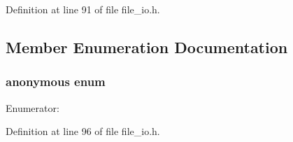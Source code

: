 Definition at line 91 of file file\_\-io.h.



\subsection{Member Enumeration Documentation}
\hypertarget{classmocha_1_1_file_i_o_a33f3257114b98f0bcfd1b453502322cc}{
\subsubsection[{"@24}]{\setlength{\rightskip}{0pt plus 5cm}anonymous enum}}
\label{classmocha_1_1_file_i_o_a33f3257114b98f0bcfd1b453502322cc}
\begin{Desc}
\item[Enumerator: ]\par
\begin{description}
\item[{\em 
\hypertarget{classmocha_1_1_file_i_o_a33f3257114b98f0bcfd1b453502322ccacde5ebe2d91c18522bb0f9258c35224f}{
P\_\-ReadOnly}
\label{classmocha_1_1_file_i_o_a33f3257114b98f0bcfd1b453502322ccacde5ebe2d91c18522bb0f9258c35224f}
}]\item[{\em 
\hypertarget{classmocha_1_1_file_i_o_a33f3257114b98f0bcfd1b453502322cca18755b1d05959c7f280a15ab63a8396a}{
P\_\-ReadWrite}
\label{classmocha_1_1_file_i_o_a33f3257114b98f0bcfd1b453502322cca18755b1d05959c7f280a15ab63a8396a}
}]\end{description}
\end{Desc}



Definition at line 96 of file file\_\-io.h.

